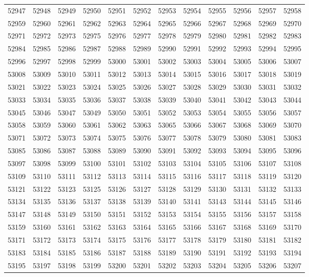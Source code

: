 \begin{center}
\begin{longtable}{llllllllllll}
52947 &52948 &52949 &52950 &52951 &52952 &52953 &52954 &52955 &52956 &52957 &52958 \\
52959 &52960 &52961 &52962 &52963 &52964 &52965 &52966 &52967 &52968 &52969 &52970 \\
52971 &52972 &52973 &52975 &52976 &52977 &52978 &52979 &52980 &52981 &52982 &52983 \\
52984 &52985 &52986 &52987 &52988 &52989 &52990 &52991 &52992 &52993 &52994 &52995 \\
52996 &52997 &52998 &52999 &53000 &53001 &53002 &53003 &53004 &53005 &53006 &53007 \\
53008 &53009 &53010 &53011 &53012 &53013 &53014 &53015 &53016 &53017 &53018 &53019 \\
53021 &53022 &53023 &53024 &53025 &53026 &53027 &53028 &53029 &53030 &53031 &53032 \\
53033 &53034 &53035 &53036 &53037 &53038 &53039 &53040 &53041 &53042 &53043 &53044 \\
53045 &53046 &53047 &53049 &53050 &53051 &53052 &53053 &53054 &53055 &53056 &53057 \\
53058 &53059 &53060 &53061 &53062 &53063 &53065 &53066 &53067 &53068 &53069 &53070 \\
53071 &53072 &53073 &53074 &53075 &53076 &53077 &53078 &53079 &53080 &53081 &53083 \\
53085 &53086 &53087 &53088 &53089 &53090 &53091 &53092 &53093 &53094 &53095 &53096 \\
53097 &53098 &53099 &53100 &53101 &53102 &53103 &53104 &53105 &53106 &53107 &53108 \\
53109 &53110 &53111 &53112 &53113 &53114 &53115 &53116 &53117 &53118 &53119 &53120 \\
53121 &53122 &53123 &53125 &53126 &53127 &53128 &53129 &53130 &53131 &53132 &53133 \\
53134 &53135 &53136 &53137 &53138 &53139 &53140 &53141 &53143 &53144 &53145 &53146 \\
53147 &53148 &53149 &53150 &53151 &53152 &53153 &53154 &53155 &53156 &53157 &53158 \\
53159 &53160 &53161 &53162 &53163 &53164 &53165 &53166 &53167 &53168 &53169 &53170 \\
53171 &53172 &53173 &53174 &53175 &53176 &53177 &53178 &53179 &53180 &53181 &53182 \\
53183 &53184 &53185 &53186 &53187 &53188 &53189 &53190 &53191 &53192 &53193 &53194 \\
53195 &53197 &53198 &53199 &53200 &53201 &53202 &53203 &53204 &53205 &53206 &53207 \\

\end{longtable}
\end{center}
